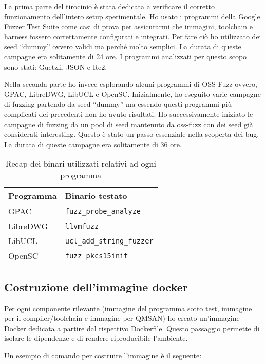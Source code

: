 La prima parte del tirocinio è stata dedicata a verificare il corretto funzionamento dell’intero setup sperimentale. Ho usato i programmi della Google Fuzzer Test Suite come casi di prova per assicurarmi che immagini, toolchain e harness fossero correttamente configurati e integrati. Per fare ciò ho utilizzato dei seed “dummy” ovvero validi ma perché molto semplici. La durata di queste campagne era solitamente di 24 ore. I programmi analizzati per questo scopo sono stati: Guetzli, JSON e Re2.

Nella seconda parte ho invece esplorando alcuni programmi di OSS-Fuzz ovvero, GPAC, LibreDWG, LibUCL e OpenSC. Inizialmente, ho eseguito varie campagne di fuzzing partendo da seed “dummy” ma essendo questi programmi più complicati dei precedenti non ho avuto risultati. Ho successivamente iniziato le campagne di fuzzing da un pool di seed mantenuto da oss-fuzz con dei seed già considerati interesting. Questo è stato un passo essenziale nella scoperta dei bug. La durata di queste campagne era solitamente di 36 ore. 

\begin{table}[ht]
  \centering
  \caption{Recap dei binari utilizzati relativi ad ogni programma}
  \label{tab:recap-binari}
  \begin{tabular}{ll}
    \toprule
    \textbf{Programma} & \textbf{Binario testato} \\
    \midrule
    GPAC    & \texttt{fuzz\_probe\_analyze} \\
    LibreDWG & \texttt{llvmfuzz} \\
    LibUCL  & \texttt{ucl\_add\_string\_fuzzer} \\
    OpenSC  & \texttt{fuzz\_pkcs15init} \\
    \bottomrule
  \end{tabular}
\end{table}

\subsection{Costruzione dell'immagine docker}

Per ogni componente rilevante (immagine del programma sotto test, immagine per il compiler/toolchain e immagine per QMSAN) ho creato un’immagine Docker dedicata a partire dal rispettivo Dockerfile. 
Questo passaggio permette di isolare le dipendenze e di rendere riproducibile l’ambiente.

Un esempio di comando per costruire l’immagine è il seguente:

